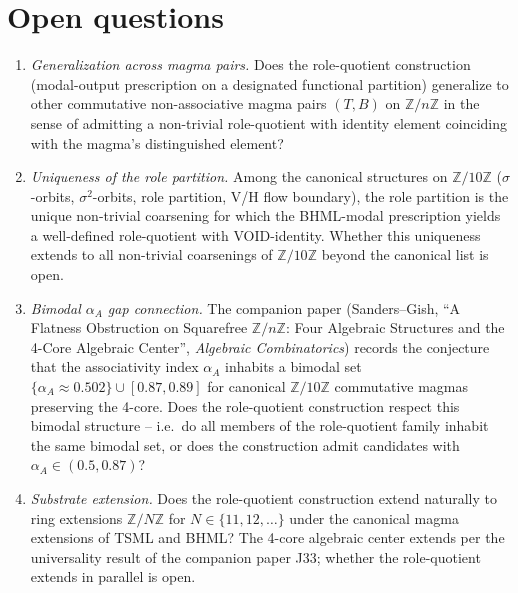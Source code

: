\documentclass[11pt,reqno]{amsart}
\theoremstyle{plain}
\theoremstyle{definition}
\theoremstyle{remark}
\newcommand{\Z}{\mathbb{Z}}
\begin{document}
\section{Open questions} \label{sec:open}

\begin{enumerate}[label=(\arabic*)]
\item \emph{Generalization across magma pairs.} Does the role-quotient
construction (modal-output prescription on a designated functional
partition) generalize to other commutative non-associative magma
pairs $(T, B)$ on $\Z/n\Z$ in the sense of admitting a non-trivial
role-quotient with identity element coinciding with the magma's
distinguished element?

\item \emph{Uniqueness of the role partition.} Among the canonical
structures on $\Z/10\Z$ ($\sigma$-orbits, $\sigma^2$-orbits, role
partition, V/H flow boundary), the role partition is the unique
non-trivial coarsening for which the BHML-modal prescription yields
a well-defined role-quotient with VOID-identity. Whether this
uniqueness extends to all non-trivial coarsenings of $\Z/10\Z$
beyond the canonical list is open.

\item \emph{Bimodal $\alpha_A$ gap connection.} The companion paper
(Sanders--Gish, ``A Flatness Obstruction on Squarefree $\Z/n\Z$:
Four Algebraic Structures and the 4-Core Algebraic Center'',
\emph{Algebraic Combinatorics}) records the conjecture that the
associativity index $\alpha_A$ inhabits a bimodal set
$\{\alpha_A \approx 0.502\} \cup [0.87, 0.89]$ for canonical
$\Z/10\Z$ commutative magmas preserving the 4-core. Does the
role-quotient construction respect this bimodal structure -- i.e.\
do all members of the role-quotient family inhabit the same bimodal
set, or does the construction admit candidates with
$\alpha_A \in (0.5, 0.87)$?

\item \emph{Substrate extension.} Does the role-quotient construction
extend naturally to ring extensions $\Z/N\Z$ for $N \in \{11, 12, \ldots\}$
under the canonical magma extensions of TSML and BHML? The 4-core
algebraic center extends per the universality result of the
companion paper J33; whether the role-quotient extends in parallel
is open.
\end{enumerate}
\end{document}
